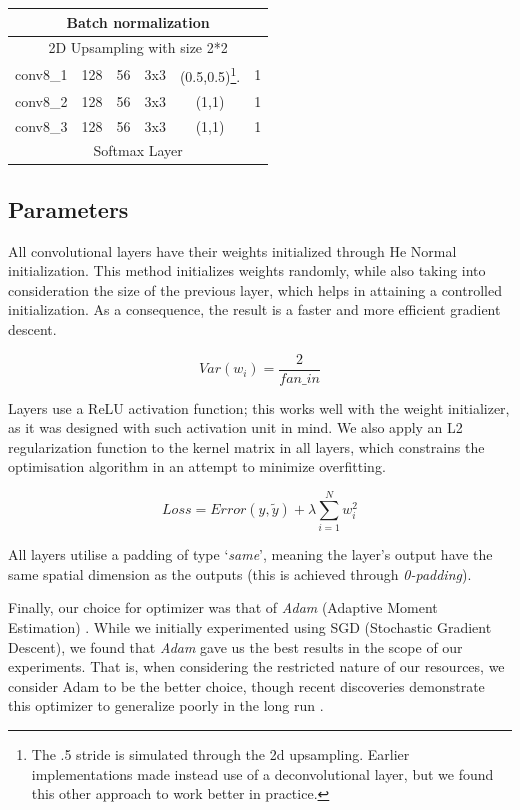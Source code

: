 \documentclass[twoside,twocolumn]{article}
\begin{document}
\begin{table}
\begin{tabular}{|c|c|c|c|c|c|}
	\multicolumn{6}{|c|}{Batch normalization}\\ \hline
	\multicolumn{6}{|c|}{2D Upsampling with size 2*2}\\ \hline
	conv8\_1 & 128 & 56 & 3x3 & (0.5,0.5)\footnote{The .5 stride is simulated through the 2d upsampling. Earlier implementations made instead use of a deconvolutional layer, but we found this other approach to work better in practice.
	}. & 1 \\ \hline
	conv8\_2 & 128 & 56 & 3x3 & (1,1) & 1 \\ \hline
	conv8\_3 & 128 & 56 & 3x3 & (1,1) & 1 \\ \hline
	\multicolumn{6}{|c|}{Softmax Layer}\\ \hline

\end{tabular}
\end{table}


\subsection{Parameters}

All convolutional layers have their weights initialized through He Normal \cite{Kaiming:2015} initialization. This method initializes weights randomly, while also taking into consideration the size of the previous layer, which helps in attaining a controlled initialization. As a consequence, the result is a faster and more efficient gradient descent.

\begin{equation}
Var(w_i) = \frac{2}{fan\_in}
\end{equation}

Layers use a ReLU activation function; this works well with the weight initializer, as it was designed with such activation unit in mind. We also apply an L2 regularization function to the kernel matrix in all layers, which constrains the optimisation algorithm in an attempt to minimize overfitting.

\begin{equation}
Loss = Error(y,\tilde{y}) + \lambda\sum_{i=1}^{N} w_i^2
\end{equation}

All layers utilise a padding of type ‘\textit{same}’, meaning the layer’s output have the same spatial dimension as the outputs (this is achieved through \textit{0-padding}).

Finally, our choice for optimizer was that of \textit{Adam} (Adaptive Moment Estimation) \cite{Diaderik:2015}. While we initially experimented using SGD (Stochastic Gradient Descent), we found that \textit{Adam} gave us the best results in the scope of our experiments. That is, when considering the restricted nature of our resources, we consider Adam to be the better choice, though recent discoveries demonstrate this optimizer to generalize poorly in the long run \cite{Nitish:2017}.
\end{document}
